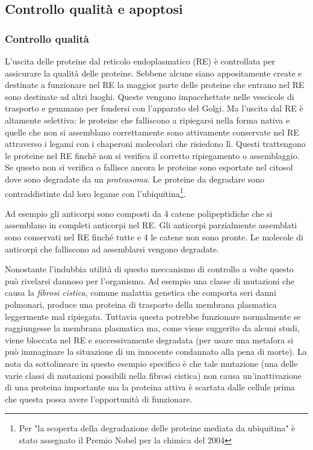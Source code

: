 \subsection{Controllo qualità e apoptosi}
{
\subsubsection{Controllo qualità}
L'uscita delle proteine dal reticolo endoplasmatico (RE) è controllata per assicurare la qualità delle proteine. Sebbene alcune siano appositamente create e destinate a funzionare nel RE la maggior parte delle proteine che entrano nel RE sono destinate ad altri luoghi. Queste vengono impacchettate nelle vescicole di trasporto e gemmano per fondersi con l'apparato del Golgi. Ma l'uscita dal RE è altamente selettiva: le proteine che falliscono a ripiegarsi nella forma nativa e quelle che non si assemblano correttamente sono attivamente conservate nel RE attraverso i legami con i chaperoni molecolari che risiedono lì. Questi trattengono le proteine nel RE finché non si verifica il corretto ripiegamento o assemblaggio. Se questo non si verifica o fallisce ancora le proteine sono esportate nel citosol dove sono degradate da un \textit{proteasoma}. Le proteine da degradare sono contraddistinte dal loro legame con l'ubiquitina\footnote{Per "la scoperta della degradazione delle proteine mediata da ubiquitina" è stato assegnato il Premio Nobel per la chimica del 2004}.

\par Ad esempio gli anticorpi sono composti da 4 catene polipeptidiche che si assemblano in completi anticorpi nel RE. Gli anticorpi parzialmente assemblati sono conservati nel RE finché tutte e 4 le catene non sono pronte. Le molecole di anticorpi che falliscono ad assemblarsi vengono degradate.


\par Nonostante l'indubbia utilità di questo meccanismo di controllo a volte questo può rivelarsi dannoso per l'organismo. Ad esempio una classe di mutazioni che causa la \textit{fibrosi cistica}, comune malattia genetica che comporta seri danni polmonari, produce una proteina di trasporto della membrana plasmatica leggermente mal ripiegata. Tuttavia questa potrebbe funzionare normalmente se raggiungesse la membrana plasmatica ma, come viene suggerito da alcuni studi\supercite{fraser2015cystic}, viene bloccata nel RE e successivamente degradata\supercite{alberts2018essential} (per usare una metafora si può immaginare la situazione di un innocente condannato alla pena di morte). La nota da sottolineare in questo esempio specifico è che tale mutazione (una delle varie classi di mutazioni possibili nella fibrosi cistica) non causa un'inattivazione di una proteina importante ma la proteina attiva è scartata dalle cellule prima che questa possa avere l'opportunità di funzionare. \\

}

